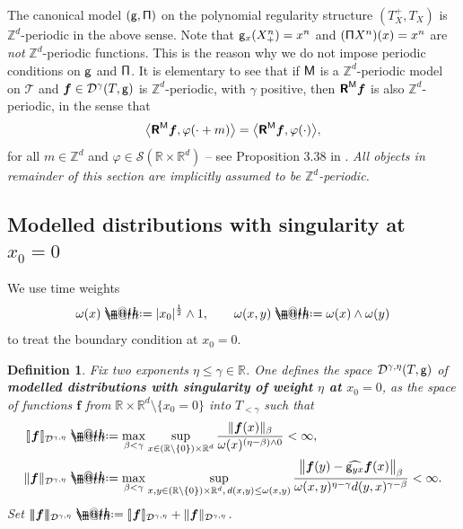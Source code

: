 \documentclass[10pt, reqno]{amsart}
\makeatletter
\numberwithin{subsection}{section}
\numberwithin{subsubsection}{subsection}
\numberwithin{equation}{section} %
\theoremstyle{mystyle}
\theoremstyle{mystyle2}
\newtheorem*{defn*} {Definition}
\theoremstyle{mystyle3}
\newcommand{\trino}[1]{|\!|\!|#1|\!|\!|}
\newcommand{\brarb}[1]{[\hspace{-0.5mm}]#1[\hspace{-0.5mm}]}
\newcommand{\bsf}{\boldsymbol{f}}
\newcommand\bbR{\mathbb{R}}
\newcommand\bbZ{\mathbb{Z}}
\newcommand{\mcD}{\mathcal{D}}
\newcommand\mcS{\mathcal{S}}
\newcommand{\Xplus}{X_+}
\newcommand*{\defeq}{\mathrel{\rlap{%
                     \raisebox{0.3ex}{$\m@th\cdot$}}%
                     \raisebox{-0.3ex}{$\m@th\cdot$}}%
                     =}
\makeatother
\begin{document}
\medskip

The canonical model $({\sf g},{\sf \Pi})$ on the polynomial regularity structure $(T_X^+,T_X)$ is $\bbZ^d$-periodic in the above sense. Note that ${\sf g}_x(\Xplus^n)=x^n$ and $({\sf\Pi}X^n)(x)=x^n$ are \emph{not} $\bbZ^d$-periodic functions.
This is the reason why we do not impose periodic conditions on ${\sf g}$ and ${\sf\Pi}$.
It is elementary to see that if $\sf M$ is a $\bbZ^d$-periodic model on $\mathscr{T}$ and $\bsf\in\mcD^\gamma(T,\sf g)$ is $\bbZ^d$-periodic, with 
$\gamma$ positive, then $\textsf{\textbf{R}}^{\sf M}\bsf$ is also $\bbZ^d$-periodic, in the sense that 
$$
\big\langle \textsf{\textbf{R}}^{\sf M}\bsf, \varphi(\cdot+m)\big\rangle = \big\langle \textsf{\textbf{R}}^{\sf M}\bsf, \varphi(\cdot)\big\rangle,
$$
for all $m\in\bbZ^d$ and $\varphi\in\mcS(\bbR\times\bbR^d)$ -- see Proposition 3.38 in \cite{Hai14}. {\it All objects in remainder of this section 
are implicitly assumed to be $\bbZ^d$-periodic.}



\bigskip



\subsection{Modelled distributions with singularity at $x_0=0$}
\label{SubsectionTimeWeight}

We use time weights
$$
\omega(x)\defeq|x_0|^{\frac12}\wedge1,\qquad
\omega(x,y)\defeq\omega(x)\wedge\omega(y)
$$
to treat the boundary condition at $x_0=0$.

\medskip

\begin{defn*}
Fix two exponents $\eta\le\gamma\in\bbR$. One defines the space $\mcD^{\gamma,\eta}(T,{\sf g})$ of \textbf{\textsf{modelled distributions with singularity of weight $\eta$ at $x_0=0$}}, as the space of functions $\bsf$ from $\bbR\times\bbR^d\setminus\{x_0=0\}$ into $T_{<\gamma}$ such that
\begin{align}\label{Def singular MD}
\begin{aligned}
\brarb{\bsf}_{\mcD^{\gamma,\eta}}
&\defeq  \max_{\beta<\gamma}\sup_{x\in(\bbR\setminus\{0\})\times\bbR^d}
\frac{\|\bsf(x)\|_\beta}{\omega(x)^{(\eta-\beta)\wedge0}}<\infty,   \\
\|\bsf\|_{\mcD^{\gamma,\eta}}
&\defeq  \max_{\beta<\gamma}\sup_{x,y\in(\bbR\setminus\{0\})\times\bbR^d,\, d(x,y)\le\omega(x,y)}
\frac{\big\|\bsf(y)-\widehat{{\sf g}_{yx}}\bsf(x)\big\|_\beta}{\omega(x,y)^{\eta-\gamma}d(y,x)^{\gamma-\beta}}<\infty.
\end{aligned}
\end{align}
Set $\trino{\bsf}_{\mcD^{\gamma,\eta}}\defeq \brarb{\bsf}_{\mcD^{\gamma,\eta}}+\|\bsf\|_{\mcD^{\gamma,\eta}}$.
\end{defn*}
\end{document}
